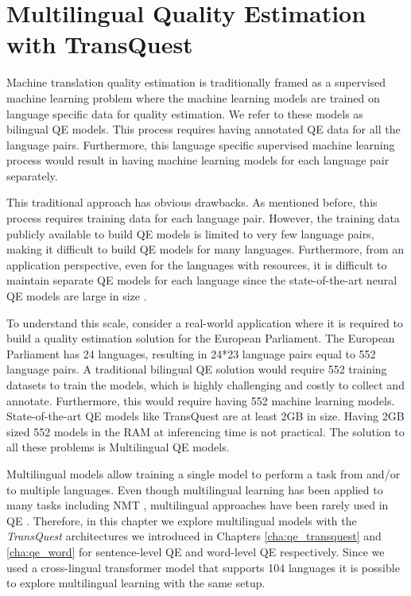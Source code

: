\newcommand\figlength{6cm}

\chapter{\label{cha:qe_multilingual}Multilingual Quality Estimation with TransQuest}

Machine translation quality estimation is traditionally framed as a supervised machine learning problem \autocite{kepler-etal-2019-openkiwi,lee-2020-two} where the machine learning models are trained on language specific data for quality estimation. We refer to these models as bilingual QE models. This process requires having annotated QE data for all the language pairs. Furthermore, this language specific supervised machine learning process would result in having machine learning models for each language pair separately. 

This traditional approach has obvious drawbacks. As mentioned before, this process requires training data for each language pair. However, the training data publicly available to build QE models is limited to very few language pairs, making it difficult to build QE models for many languages. Furthermore, from an application perspective, even for the languages with resources, it is difficult to maintain separate QE models for each language since the state-of-the-art neural QE models are large in size \autocite{ranasinghe-etal-2020-transquest}. 

To understand this scale, consider a real-world application where it is required to build a quality estimation solution for the European Parliament. The European Parliament has 24 languages, resulting in 24*23 language pairs equal to 552 language pairs. A traditional bilingual QE solution would require 552 training datasets to train the models, which is highly challenging and costly to collect and annotate. Furthermore, this would require having 552 machine learning models. State-of-the-art QE models like TransQuest are at least 2GB in size. Having 2GB sized 552 models in the RAM at inferencing time is not practical. The solution to all these problems is Multilingual QE models. 

Multilingual models allow training a single model to perform a task from and/or to multiple languages. Even though multilingual learning has been applied to many tasks \autocite{ranasinghe-zampieri-2020-multilingual,ranasinghe-zampieri-2021-mudes} including NMT \autocite{nguyen-chiang-2017-transfer, aharoni-etal-2019-massively}, multilingual approaches have been rarely used in QE \autocite{sun-etal-2020-exploratory}. Therefore, in this chapter we explore multilingual models with the \textit{TransQuest} architectures we introduced in Chapters \ref{cha:qe_transquest} and \ref{cha:qe_word} for sentence-level QE and word-level QE respectively. Since we used a cross-lingual transformer model that supports 104 languages \autocite{conneau-etal-2020-unsupervised} it is possible to explore multilingual learning with the same setup.


